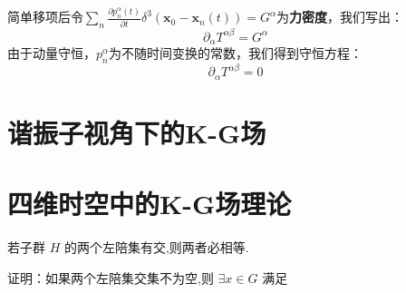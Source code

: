 \documentclass[../main.tex]{subfiles}
\begin{document}
    简单移项后令$\sum_{n} \frac{\partial p_n^{\alpha}(t)}{\partial t}\delta^3(\bm{x}_0 - \bm{x}_n(t)) = G^{\alpha}$为\textbf{力密度}，我们写出：
    \begin{equation}
        \partial_{\alpha} T^{\alpha\beta} = G^{\alpha}
    \end{equation}
    由于动量守恒，$p_n^{\alpha}$为不随时间变换的常数，我们得到守恒方程：
    \begin{equation}
        \partial_{\alpha} T^{\alpha\beta} = 0
    \end{equation}
\section{谐振子视角下的K-G场}


\section{四维时空中的K-G场理论}
\label{ch:1.4}


\begin{note}
    若子群 $H$ 的两个左陪集有交,则两者必相等.
\end{note}
    \noindent
    证明：如果两个左陪集交集不为空,则 $\exists x \in G$ 满足
\end{document}
